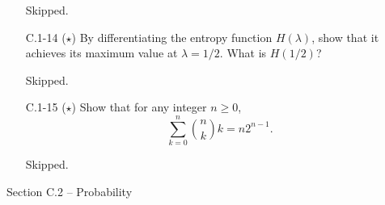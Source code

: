 \begin{enumerate}
\begin{framed}
Skipped.
\end{framed}

\item[C.1{-}14] {($\star$) By differentiating the entropy function $H(\lambda)$,
show that it achieves its maximum value at $\lambda = 1/2$. What is $H(1/2)$?}

\begin{framed}
Skipped.
\end{framed}

\item[C.1{-}15] {($\star$) Show that for any integer $n \ge 0$,
\[
  \sum_{k = 0}^{n} \binom{n}{k} k = n 2^{n - 1}.
\]
}

\begin{framed}
Skipped.
\end{framed}

\end{enumerate}

\newpage

{\large Section C.2 {--} Probability}

